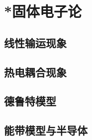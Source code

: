 

\section{*固体电子论}\label{12-2}

\subsection{线性输运现象}\label{12-2-1}

\subsection{热电耦合现象}\label{12-2-2}

\subsection{德鲁特模型}\label{12-2-3}

\subsection{能带模型与半导体}\label{12-2-4}